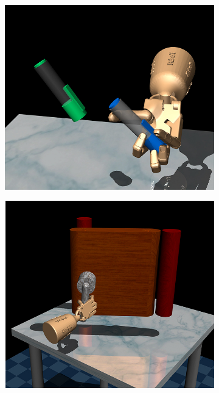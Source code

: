 \begin{figure}[tpb]
    \center
    \hspace{0.04\textwidth}
    \begin{subfigure}[b]{0.3\textwidth}
        \center
        \includegraphics[height=0.8\linewidth]{awac/figures/imgs/pen.jpg}
    \end{subfigure}
    \begin{subfigure}[b]{0.3\textwidth}
        \center
        \includegraphics[height=0.8\linewidth]{awac/figures/imgs/door.jpg}
    \end{subfigure}
    \begin{subfigure}[b]{0.3\textwidth}

\end{subfigure}
\end{figure}
